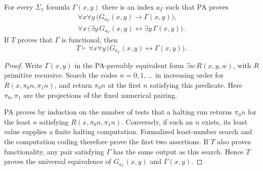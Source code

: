 \begin{lemma}\label{lem:syntactic-functional-search}
For every $\Sigma_1$ formula $\Gamma(x,y)$ there is an index
$a_\Gamma$ such that PA proves
\begin{gather*}
 \forall x\forall y\,
   \bigl(G_{a_\Gamma}(x,y)\longrightarrow\Gamma(x,y)\bigr),\\
 \forall x\,
   \bigl(\exists y\,G_{a_\Gamma}(x,y)
          \longleftrightarrow\exists y\,\Gamma(x,y)\bigr).
\end{gather*}
If $T$ proves that $\Gamma$ is functional, then
\[
 T\vdash\forall x\forall y\,
       \bigl(G_{a_\Gamma}(x,y)\longleftrightarrow\Gamma(x,y)\bigr).
\]
\end{lemma}
\begin{proof}
Write $\Gamma(x,y)$ in the PA-provably equivalent form
$\exists w\,R(x,y,w)$, with $R$ primitive recursive. Search the
codes $n=0,1,\ldots$ in increasing order for
$R(x,\pi_0n,\pi_1n)$, and return $\pi_0n$ at the first $n$ satisfying
this predicate. Here $\pi_0,\pi_1$ are the projections of the fixed numerical
pairing.

PA proves by induction on the number of tests that a halting run
returns $\pi_0n$ for the least $n$ satisfying $R(x,\pi_0n,\pi_1n)$. Conversely,
if such an $n$ exists, its least value supplies a finite
halting computation. Formalized least-number search and the
computation coding therefore prove the first two assertions.
If $T$ also proves functionality, any pair satisfying $\Gamma$
has the same output as this search. Hence $T$ proves the universal equivalence of $G_{a_\Gamma}(x,y)$ and
$\Gamma(x,y)$.
\end{proof}

